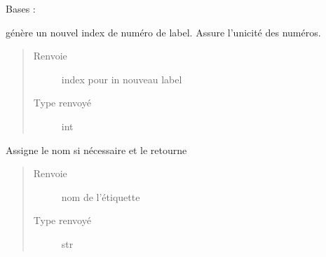\documentclass[letterpaper,10pt,french]{sphinxmanual}
\begin{document}
\begin{fulllineitems}
\label{\detokenize{label:label.Label}}
Bases : 

\begin{fulllineitems}
\label{\detokenize{label:label.Label.PREFIX}}
\end{fulllineitems}


\begin{fulllineitems}
\label{\detokenize{label:label.Label.getNextFreeIndex}}
génère un nouvel index de numéro de label. Assure l’unicité des numéros.
\begin{quote}\begin{description}
\item[{Renvoie}] \leavevmode
index pour in nouveau label

\item[{Type renvoyé}] \leavevmode
int

\end{description}\end{quote}

\end{fulllineitems}


\begin{fulllineitems}
\label{\detokenize{label:label.Label.name}}
Assigne le nom si nécessaire et le retourne
\begin{quote}\begin{description}
\item[{Renvoie}] \leavevmode
nom de l’étiquette

\item[{Type renvoyé}] \leavevmode
str

\end{description}\end{quote}

\end{fulllineitems}


\end{fulllineitems}
\end{document}
